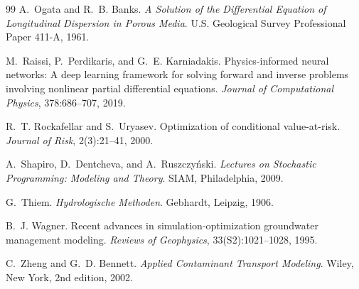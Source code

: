 \documentclass[11pt]{article}
\numberwithin{equation}{section}
\theoremstyle{plain}
\begin{document}
\begin{thebibliography}{99}
A.~Ogata and R.~B. Banks.
\textit{A Solution of the Differential Equation of Longitudinal Dispersion in
Porous Media}.
U.S. Geological Survey Professional Paper 411-A, 1961.

M.~Raissi, P.~Perdikaris, and G.~E. Karniadakis.
Physics-informed neural networks: A deep learning framework for solving forward
and inverse problems involving nonlinear partial differential equations.
\textit{Journal of Computational Physics}, 378:686--707, 2019.

R.~T. Rockafellar and S.~Uryasev.
Optimization of conditional value-at-risk.
\textit{Journal of Risk}, 2(3):21--41, 2000.

A.~Shapiro, D.~Dentcheva, and A.~Ruszczy\'nski.
\textit{Lectures on Stochastic Programming: Modeling and Theory}.
SIAM, Philadelphia, 2009.

G.~Thiem.
\textit{Hydrologische Methoden}.
Gebhardt, Leipzig, 1906.

B.~J. Wagner.
Recent advances in simulation-optimization groundwater management modeling.
\textit{Reviews of Geophysics}, 33(S2):1021--1028, 1995.

C.~Zheng and G.~D. Bennett.
\textit{Applied Contaminant Transport Modeling}.
Wiley, New York, 2nd edition, 2002.

\end{thebibliography}
\end{document}
